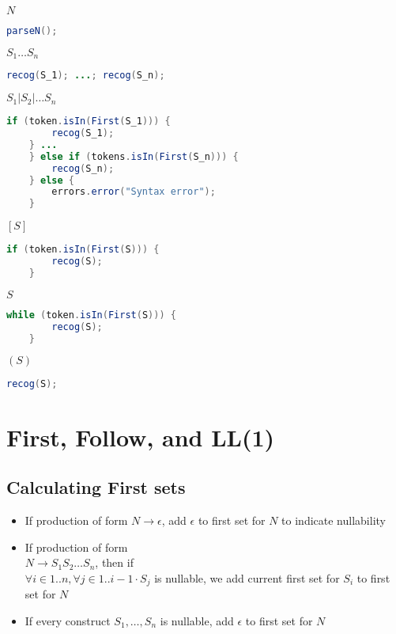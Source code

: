 \documentclass[fontsize=10pt,a4paper]{article}
\begin{document}
\begin{multicols}{3}
    $N$
    \begin{lstlisting}[language=Java, basicstyle=\tiny]
    parseN();
    \end{lstlisting}

    $S_1 \dots S_n$
    \begin{lstlisting}[language=Java, basicstyle=\tiny]
    recog(S_1); ...; recog(S_n);
    \end{lstlisting}

    $S_1 \vert S_2 \vert \dots S_n$
    \begin{lstlisting}[language=Java, basicstyle=\tiny]
    if (token.isIn(First(S_1))) {
        recog(S_1);
    } ...
    } else if (tokens.isIn(First(S_n))) {
        recog(S_n);
    } else {
        errors.error("Syntax error");
    }
    \end{lstlisting}



    $[S]$
    \begin{lstlisting}[language=Java, basicstyle=\tiny]
    if (token.isIn(First(S))) {
        recog(S);
    }
    \end{lstlisting}

    ${S}$
    \begin{lstlisting}[language=Java, basicstyle=\tiny]
    while (token.isIn(First(S))) {
        recog(S);
    }
    \end{lstlisting}

    $(S)$
    \begin{lstlisting}[language=Java, basicstyle=\tiny]
    recog(S);
    \end{lstlisting}



    \section{First, Follow, and LL(1)}


    \subsection{Calculating First sets}

    \begin{itemize}
        \item If production of form $N \rightarrow \epsilon$, add $\epsilon$ to first set for $N$ to indicate nullability
        \item If production of form \\$N \rightarrow S_1 S_2 \ldots S_n$, then if \\$\forall i \in 1..n, \forall j \in 1..i-1 \cdot S_j$ is nullable, we add current first set for $S_i$ to first set for $N$
        \item If every construct $S_1, \ldots, S_n$ is nullable, add $\epsilon$ to first set for $N$
    \end{itemize}


\end{multicols}
\end{document}
